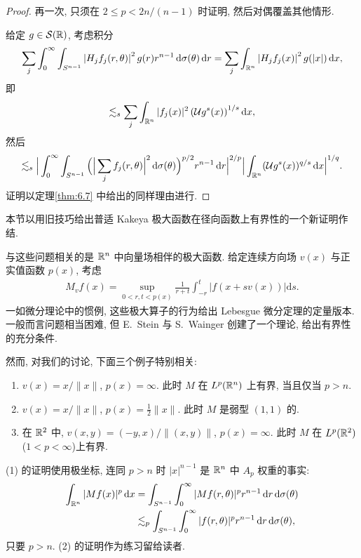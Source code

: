 \begin{proof}
再一次, 只须在 $2 \leq p < 2n/(n-1)$ 时证明, 然后对偶覆盖其他情形.

给定 $g \in \mathcal{S}(\mathbb{R})$, 考虑积分
\begin{align*}
  \sum_{j}\int_{0}^{\infty}\int_{S^{n-1}}\left|H_{j}f_{j}(r,\theta)\right|^{2}g(r)r^{n-1}\,\mathrm{d}\sigma(\theta)\,\mathrm{d}r
  =\sum_{j}\int_{\mathbb{R}^{n}}\left|H_{j}f_{j}(x)\right|^{2}g(|x|)\,\mathrm{d}x,
\end{align*}
即
\begin{align*}
  \lesssim_{s}\sum_{j}\int_{\mathbb{R}^{n}}|f_{j}(x)|^{2}\left(\mathcal{U}g^{s}(x)\right)^{1/s}\mathrm{d}x,
\end{align*}
然后
\begin{align*}
  \lesssim_{s}\Big|\int_{0}^{\infty}\int_{S^{n-1}}\Big(\Big|\sum_{j}f_{j}(r,\theta)\Big|^{2}\,\mathrm{d}\sigma(\theta)\Big)^{p/2}r^{n-1}\,\mathrm{d}r\Big|^{2/p}
  \Big|\int_{\mathbb{R}^{n}}(\mathcal{U}g^{s}(x))^{q/s}\,\mathrm{d}x\Big|^{1/q}.
\end{align*}
证明以定理\ref{thm:6.7} 中给出的同样理由进行.
\end{proof}

本节以用旧技巧给出普适 Kakeya 极大函数在径向函数上有界性的一个新证明作结.

与这些问题相关的是 $\mathbb{R}^n$ 中向量场相伴的极大函数. 给定连续方向场 $v(x)$ 与正实值函数 $p(x)$, 考虑
\begin{align*}
  M_{v}f(x)=\sup_{0<r,t<p(x)}\frac{1}{r+t}\int_{-r}^{t}\left|f(x+sv(x))\right|\mathrm{d}s.
\end{align*}
一如微分理论中的惯例, 这些极大算子的行为给出 Lebesgue 微分定理的定量版本. 一般而言问题相当困难, 但 E.~Stein 与 S.~Wainger \cite{b126} 创建了一个理论, 给出有界性的充分条件.

然而, 对我们的讨论, 下面三个例子特别相关:

\begin{enumerate}
\item[(1)] $v(x) = x/\|x\|$, $p(x) = \infty$. 此时 $M$ 在 $L^p(\mathbb{R}^n)$ 上有界, 当且仅当 $p > n$.
\item[(2)] $v(x) = x/\|x\|$, $p(x) = \frac{1}{2}\|x\|$. 此时 $M$ 是弱型 $(1, 1)$ 的.
\item[(3)] 在 $\mathbb{R}^2$ 中, $v(x,y) = (-y,x)/\|(x,y)\|$, $p(x) = \infty$. 此时 $M$ 在 $L^p(\mathbb{R}^2)$($1 < p < \infty$)上有界.
\end{enumerate}

(1) 的证明使用极坐标, 连同 $p > n$ 时 $|x|^{n-1}$ 是 $\mathbb{R}^n$ 中 $A_p$ 权重的事实:
\begin{align*}
  \int_{\mathbb{R}^{n}}|Mf(x)|^{p}\,\mathrm{d}x
  &=\int_{S^{n-1}}\int_{0}^\infty|Mf(r,\theta)|^{p}r^{n-1}\,\mathrm{d}r\,\mathrm{d}\sigma(\theta)\\
  &\lesssim_{p}\int_{S^{n-1}}\int_{0}^\infty|f(r,\theta)|^{p}r^{n-1}\,\mathrm{d}r\,\mathrm{d}\sigma(\theta),
\end{align*}
只要 $p > n$. (2) 的证明作为练习留给读者.

